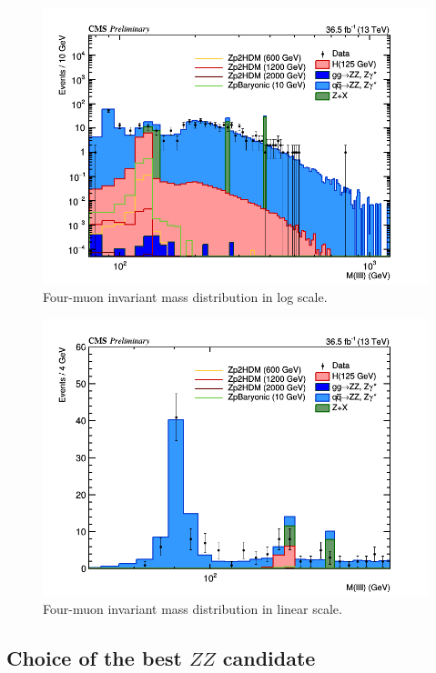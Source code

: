 \begin{figure}[tbh]
\centering
\includegraphics[width=5.5in]{figures/hist_hM4l_8_log.png}
    \caption{Four-muon invariant mass distribution in log scale.}
    \label{fig:m4mulog}
\end{figure}

\begin{figure}[tbh]
\centering
\includegraphics[width=5.5in]{figures/hist_hM4l_8_linear.png}
    \caption{Four-muon invariant mass distribution in linear scale.}
    \label{fig:m4mulin}
\end{figure}

\subsection{Choice of the best $ZZ$ candidate}
\label{sec:zzbestcand}

